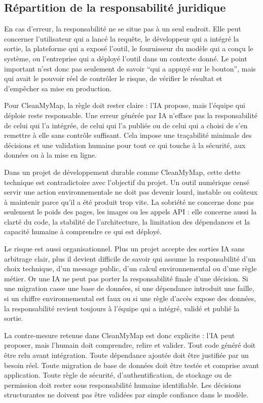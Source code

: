 \documentclass[
  10pt,
  a4paper,
  DIV=11,
  numbers=noendperiod,
  oneside]{scrreprt}
\begin{document}
\subsection{Répartition de la responsabilité
juridique}\label{ruxe9partition-de-la-responsabilituxe9-juridique}

En cas d'erreur, la responsabilité ne se situe pas à un seul endroit.
Elle peut concerner l'utilisateur qui a lancé la requête, le développeur
qui a intégré la sortie, la plateforme qui a exposé l'outil, le
fournisseur du modèle qui a conçu le système, ou l'entreprise qui a
déployé l'outil dans un contexte donné. Le point important n'est donc
pas seulement de savoir ``qui a appuyé sur le bouton'', mais qui avait
le pouvoir réel de contrôler le risque, de vérifier le résultat et
d'empêcher sa mise en production.

Pour CleanMyMap, la règle doit rester claire : l'IA propose, mais
l'équipe qui déploie reste responsable. Une erreur générée par IA
n'efface pas la responsabilité de celui qui l'a intégrée, de celui qui
l'a publiée ou de celui qui a choisi de s'en remettre à elle sans
contrôle suffisant. Cela impose une traçabilité minimale des décisions
et une validation humaine pour tout ce qui touche à la sécurité, aux
données ou à la mise en ligne.

Dans un projet de développement durable comme CleanMyMap, cette dette
technique est contradictoire avec l'objectif du projet. Un outil
numérique censé servir une action environnementale ne doit pas devenir
lourd, instable ou coûteux à maintenir parce qu'il a été produit trop
vite. La sobriété ne concerne donc pas seulement le poids des pages, les
images ou les appels API : elle concerne aussi la clarté du code, la
stabilité de l'architecture, la limitation des dépendances et la
capacité humaine à comprendre ce qui est déployé.

Le risque est aussi organisationnel. Plus un projet accepte des sorties
IA sans arbitrage clair, plus il devient difficile de savoir qui assume
la responsabilité d'un choix technique, d'un message public, d'un calcul
environnemental ou d'une règle métier. Or une IA ne peut pas porter la
responsabilité finale d'une décision. Si une migration casse une base de
données, si une dépendance introduit une faille, si un chiffre
environnemental est faux ou si une règle d'accès expose des données, la
responsabilité revient toujours à l'équipe qui a intégré, validé et
publié la sortie.

La contre-mesure retenue dans CleanMyMap est donc explicite : l'IA peut
proposer, mais l'humain doit comprendre, relire et valider. Tout code
généré doit être relu avant intégration. Toute dépendance ajoutée doit
être justifiée par un besoin réel. Toute migration de base de données
doit être testée et comprise avant application. Toute règle de sécurité,
d'authentification, de stockage ou de permission doit rester sous
responsabilité humaine identifiable. Les décisions structurantes ne
doivent pas être validées par simple confiance dans le modèle.
\end{document}
